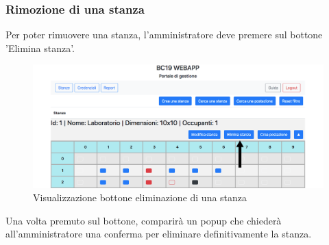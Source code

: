 \subsubsection{Rimozione di una stanza}
Per poter rimuovere una stanza, l'amministratore deve premere sul bottone 'Elimina stanza'.
\begin{figure}[H]
	\centering
	\includegraphics[width=15cm]{res/images/bottoneRemoveRoom.png}
	\caption{Visualizzazione bottone eliminazione di una stanza}
\end{figure}
Una volta premuto sul bottone, comparirà un popup che chiederà all'amministratore una conferma per eliminare definitivamente la stanza.

